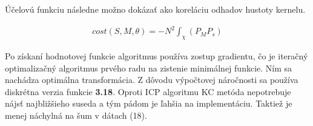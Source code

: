 Účelovú funkciu následne možno dokázať ako koreláciu odhadov hustoty kernelu.

\begin{equation}
\label{eq21}
\begin{aligned}
cost\left(S,M,\theta\right)= - N^2 \int_{\chi} \left(P_M P_s\right)
\end{aligned}
\end{equation}

Po získaní hodnotovej funkcie algoritmus používa zostup gradientu, čo je iteračný optimalizačný algoritmus prvého radu na zistenie minimálnej funkcie. Ním sa nachádza optimálna transformácia. Z dôvodu výpočtovej náročnosti sa používa diskrétna verzia funkcie\textbf{ 3.18}. Oproti ICP algoritmu KC metóda nepotrebuje nájsť najbližšieho suseda a tým pádom je ľahšia na implementáciu. Taktiež je menej náchylná na šum v dátach (18).

